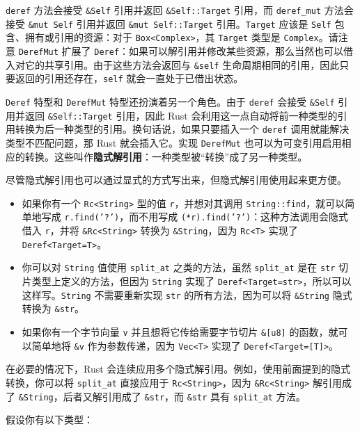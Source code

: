 \texttt{deref} 方法会接受 \texttt{\&Self} 引用并返回 \texttt{\&Self::Target} 引用，而 \texttt{deref\_mut} 方法会接受 \texttt{\&mut Self} 引用并返回 \texttt{\&mut Self::Target} 引用。\texttt{Target} 应该是 \texttt{Self} 包含、拥有或引用的资源：对于 \texttt{Box<Complex>}，其 \texttt{Target} 类型是 \texttt{Complex}。请注意 \texttt{DerefMut} 扩展了 \texttt{Deref}：如果可以解引用并修改某些资源，那么当然也可以借入对它的共享引用。由于这些方法会返回与 \texttt{\&self} 生命周期相同的引用，因此只要返回的引用还存在，\texttt{self} 就会一直处于已借出状态。

\texttt{Deref} 特型和 \texttt{DerefMut} 特型还扮演着另一个角色。由于 \texttt{deref} 会接受 \texttt{\&Self} 引用并返回 \texttt{\&Self::Target} 引用，因此 Rust 会利用这一点自动将前一种类型的引用转换为后一种类型的引用。换句话说，如果只要插入一个 \texttt{deref} 调用就能解决类型不匹配问题，那 Rust 就会插入它。实现 \texttt{DerefMut} 也可以为可变引用启用相应的转换。这些叫作\textbf{隐式解引用}：一种类型被“转换”成了另一种类型。

尽管隐式解引用也可以通过显式的方式写出来，但隐式解引用使用起来更方便。

\begin{itemize}
\item 如果你有一个 \texttt{Rc<String>} 型的值 \texttt{r}，并想对其调用 \texttt{String::find}，就可以简单地写成 \texttt{r.find('?')}，而不用写成 \texttt{(*r).find('?')}：这种方法调用会隐式借入 \texttt{r}，并将 \texttt{\&Rc<String>} 转换为 \texttt{\&String}，因为 \texttt{Rc<T>} 实现了 \texttt{Deref<Target=T>}。
\item 你可以对 \texttt{String} 值使用 \texttt{split\_at} 之类的方法，虽然 \texttt{split\_at} 是在 \texttt{str} 切片类型上定义的方法，但因为 \texttt{String} 实现了 \texttt{Deref<Target=str>}，所以可以这样写。\texttt{String} 不需要重新实现 \texttt{str} 的所有方法，因为可以将 \texttt{\&String} 隐式转换为 \texttt{\&str}。
\item 如果你有一个字节向量 \texttt{v} 并且想将它传给需要字节切片 \texttt{\&[u8]} 的函数，就可以简单地将 \texttt{\&v} 作为参数传递，因为 \texttt{Vec<T>} 实现了 \texttt{Deref<Target=[T]>}。
\end{itemize}

在必要的情况下，Rust 会连续应用多个隐式解引用。例如，使用前面提到的隐式转换，你可以将 \texttt{split\_at} 直接应用于 \texttt{Rc<String>}，因为 \texttt{\&Rc<String>} 解引用成了 \texttt{\&String}，后者又解引用成了 \texttt{\&str}，而 \texttt{\&str} 具有 \texttt{split\_at} 方法。

假设你有以下类型：

